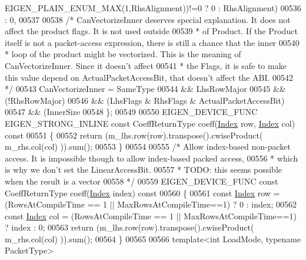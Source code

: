\begin{DoxyCode}
      EIGEN\_PLAIN\_ENUM\_MAX(1,RhsAlignment))!=0 ? 0 : RhsAlignment)
00536               : 0,
00537 
00538     \textcolor{comment}{/* CanVectorizeInner deserves special explanation. It does not affect the product flags. It is not used
       outside}
00539 \textcolor{comment}{     * of Product. If the Product itself is not a packet-access expression, there is still a chance that
       the inner}
00540 \textcolor{comment}{     * loop of the product might be vectorized. This is the meaning of CanVectorizeInner. Since it doesn't
       affect}
00541 \textcolor{comment}{     * the Flags, it is safe to make this value depend on ActualPacketAccessBit, that doesn't affect the
       ABI.}
00542 \textcolor{comment}{     */}
00543     CanVectorizeInner =    SameType
00544                         && LhsRowMajor
00545                         && (!RhsRowMajor)
00546                         && (LhsFlags & RhsFlags & ActualPacketAccessBit)
00547                         && (InnerSize %
00548   \};
00549   
00550   EIGEN\_DEVICE\_FUNC EIGEN\_STRONG\_INLINE \textcolor{keyword}{const} CoeffReturnType coeff(\hyperlink{namespace_eigen_a62e77e0933482dafde8fe197d9a2cfde}{Index} row, 
      \hyperlink{namespace_eigen_a62e77e0933482dafde8fe197d9a2cfde}{Index} col)\textcolor{keyword}{ const}
00551 \textcolor{keyword}{  }\{
00552     \textcolor{keywordflow}{return} (m\_lhs.row(row).transpose().cwiseProduct( m\_rhs.col(col) )).sum();
00553   \}
00554 
00555   \textcolor{comment}{/* Allow index-based non-packet access. It is impossible though to allow index-based packed access,}
00556 \textcolor{comment}{   * which is why we don't set the LinearAccessBit.}
00557 \textcolor{comment}{   * TODO: this seems possible when the result is a vector}
00558 \textcolor{comment}{   */}
00559   EIGEN\_DEVICE\_FUNC \textcolor{keyword}{const} CoeffReturnType coeff(\hyperlink{namespace_eigen_a62e77e0933482dafde8fe197d9a2cfde}{Index} index)\textcolor{keyword}{ const}
00560 \textcolor{keyword}{  }\{
00561     \textcolor{keyword}{const} \hyperlink{namespace_eigen_a62e77e0933482dafde8fe197d9a2cfde}{Index} row = (RowsAtCompileTime == 1 || MaxRowsAtCompileTime==1) ? 0 : index;
00562     \textcolor{keyword}{const} \hyperlink{namespace_eigen_a62e77e0933482dafde8fe197d9a2cfde}{Index} col = (RowsAtCompileTime == 1 || MaxRowsAtCompileTime==1) ? index : 0;
00563     \textcolor{keywordflow}{return} (m\_lhs.row(row).transpose().cwiseProduct( m\_rhs.col(col) )).sum();
00564   \}
00565 
00566   \textcolor{keyword}{template}<\textcolor{keywordtype}{int} LoadMode, \textcolor{keyword}{typename} PacketType>

\end{DoxyCode}
